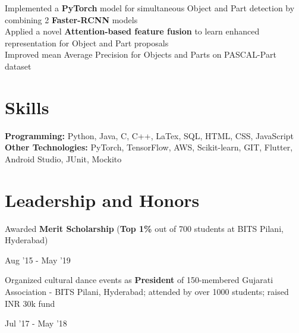 \documentclass[]{Resume}
\begin{document}
\pt Implemented a \textbf{PyTorch} model for simultaneous Object and Part detection by combining 2 \textbf{Faster-RCNN} models \\
\pt Applied a novel \textbf{Attention-based feature fusion} to learn enhanced representation for Object and Part proposals \\
\pt Improved mean Average Precision for Objects and Parts on PASCAL-Part dataset
\sectionsep

\section{Skills} 
\hrulefill

\pt \textbf{Programming:} Python, Java, C, C++, LaTex, SQL, HTML, CSS, JavaScript \\
\pt \textbf{Other Technologies:} PyTorch, TensorFlow, AWS, Scikit-learn, GIT, Flutter, Android Studio, JUnit, Mockito

\sectionsep

\section{Leadership and Honors} 
\hrulefill 

\begin{minipage}[t]{.8\textwidth}
	\pt Awarded \textbf{Merit Scholarship} (\textbf{Top 1\%} out of 700 students at BITS Pilani, Hyderabad)
\end{minipage}%
\begin{minipage}[t]{.2\textwidth}
	\hfill Aug '15 - May '19
\end{minipage}

\begin{minipage}[t]{.8\textwidth}
	\pt Organized cultural dance events as \textbf{President} of 150-membered Gujarati Association - BITS Pilani, Hyderabad; attended by over 1000 students; raised INR 30k fund
\end{minipage}%
\begin{minipage}[t]{.2\textwidth}
	\hfill Jul '17 - May '18
\end{minipage}


\end{document}
